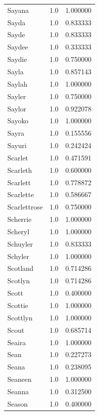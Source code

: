 \documentclass[
  letterpaper,
  DIV=11,
  numbers=noendperiod]{scrreprt}
\begin{document}
\begin{tabular}{lrr}
Sayana          &   1.0 &   1.000000 \\
Sayda           &   1.0 &   0.833333 \\
Sayde           &   1.0 &   0.833333 \\
Saydee          &   1.0 &   0.333333 \\
Saydie          &   1.0 &   0.750000 \\
Sayla           &   1.0 &   0.857143 \\
Saylah          &   1.0 &   1.000000 \\
Sayler          &   1.0 &   0.750000 \\
Saylor          &   1.0 &   0.922078 \\
Sayoko          &   1.0 &   1.000000 \\
Sayra           &   1.0 &   0.155556 \\
Sayuri          &   1.0 &   0.242424 \\
Scarlet         &   1.0 &   0.471591 \\
Scarleth        &   1.0 &   0.600000 \\
Scarlett        &   1.0 &   0.778872 \\
Scarlette       &   1.0 &   0.586667 \\
Scarlettrose    &   1.0 &   0.750000 \\
Scherrie        &   1.0 &   1.000000 \\
Scheryl         &   1.0 &   1.000000 \\
Schuyler        &   1.0 &   0.833333 \\
Schyler         &   1.0 &   1.000000 \\
Scotland        &   1.0 &   0.714286 \\
Scotlyn         &   1.0 &   0.714286 \\
Scott           &   1.0 &   0.400000 \\
Scottie         &   1.0 &   1.000000 \\
Scottlyn        &   1.0 &   1.000000 \\
Scout           &   1.0 &   0.685714 \\
Seaira          &   1.0 &   1.000000 \\
Sean            &   1.0 &   0.227273 \\
Seana           &   1.0 &   0.238095 \\
Seaneen         &   1.0 &   1.000000 \\
Seanna          &   1.0 &   0.312500 \\
Season          &   1.0 &   0.400000 \\

\end{tabular}
\end{document}
